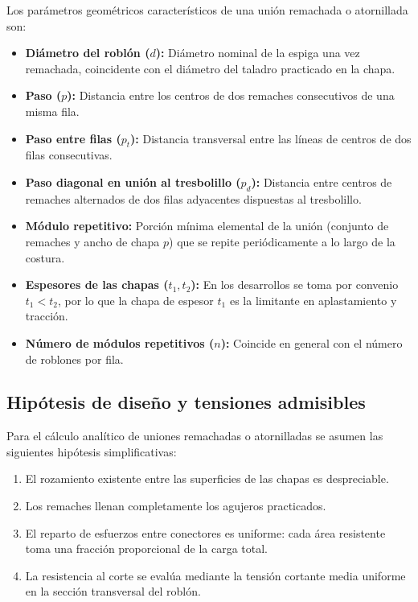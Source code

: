 Los parámetros geométricos característicos de una unión remachada o atornillada son:
\begin{itemize}
    \item \textbf{Diámetro del roblón ($d$):} Diámetro nominal de la espiga una vez remachada, coincidente con el diámetro del taladro practicado en la chapa.
    \item \textbf{Paso ($p$):} Distancia entre los centros de dos remaches consecutivos de una misma fila.
    \item \textbf{Paso entre filas ($p_t$):} Distancia transversal entre las líneas de centros de dos filas consecutivas.
    \item \textbf{Paso diagonal en unión al tresbolillo ($p_d$):} Distancia entre centros de remaches alternados de dos filas adyacentes dispuestas al tresbolillo.
    \item \textbf{Módulo repetitivo:} Porción mínima elemental de la unión (conjunto de remaches y ancho de chapa $p$) que se repite periódicamente a lo largo de la costura.
    \item \textbf{Espesores de las chapas ($t_1, t_2$):} En los desarrollos se toma por convenio $t_1 < t_2$, por lo que la chapa de espesor $t_1$ es la limitante en aplastamiento y tracción.
    \item \textbf{Número de módulos repetitivos ($n$):} Coincide en general con el número de roblones por fila.
\end{itemize}

\subsection{Hipótesis de diseño y tensiones admisibles}
Para el cálculo analítico de uniones remachadas o atornilladas se asumen las siguientes hipótesis simplificativas:
\begin{enumerate}
    \item El rozamiento existente entre las superficies de las chapas es despreciable.
    \item Los remaches llenan completamente los agujeros practicados.
    \item El reparto de esfuerzos entre conectores es uniforme: cada área resistente toma una fracción proporcional de la carga total.
    \item La resistencia al corte se evalúa mediante la tensión cortante media uniforme en la sección transversal del roblón.
\end{enumerate}

